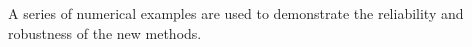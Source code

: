 \documentclass[review]{elsarticle}
\theoremstyle{plain}\newtheorem{definition}{\sc{Definition}}
\theoremstyle{defination}\newtheorem{example}{Example}[section]
\numberwithin{equation}{section}
\numberwithin{table}{section}
\begin{document}
{A series of numerical examples are used to demonstrate the reliability and robustness of the new methods.

%








}
\end{document}
